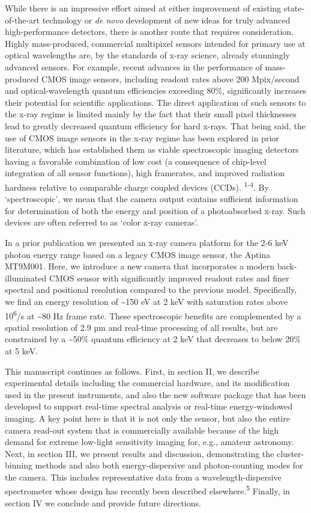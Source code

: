 While there is an impressive effort aimed at either improvement of
existing state-of-the-art technology or \emph{de novo} development of
new ideas for truly advanced high-performance detectors, there is
another route that requires consideration. Highly mass-produced,
commercial multipixel sensors intended for primary use at optical
wavelengths are, by the standards of x-ray science, already stunningly
advanced sensors. For example, recent advances in the performance of
mass-produced CMOS image sensors, including readout rates above 200
Mpix/second and optical-wavelength quantum efficiencies exceeding 80\%,
significantly increases their potential for scientific applications. The
direct application of such sensors to the x-ray regime is limited mainly
by the fact that their small pixel thicknesses lead to greatly decreased
quantum efficiency for hard x-rays. That being said, the use of CMOS
image sensors in the x-ray regime has been explored in prior literature,
which has established them as viable spectroscopic imaging detectors
having a favorable combination of low cost (a consequence of chip-level
integration of all sensor functions), high framerates, and improved
radiation hardness relative to comparable charge coupled devices (CCDs).
\textsuperscript{1-4}. By `spectroscopic', we mean that the camera
output contains sufficient information for determination of both the
energy and position of a photoabsorbed x-ray. Such devices are often
referred to as `color x-ray cameras'.

In a prior publication we presented an x-ray camera platform for the 2-6
keV photon energy range based on a legacy CMOS image sensor, the Aptina
MT9M001. Here, we introduce a new camera that incorporates a modern
back-illuminated CMOS sensor with significantly improved readout rates
and finer spectral and positional resolution compared to the previous
model. Specifically, we find an energy resolution of
\textasciitilde{}150 eV at 2 keV with saturation rates above
10\textsuperscript{6}/s at \textasciitilde{}80 Hz frame rate. These
spectroscopic benefits are complemented by a spatial resolution of 2.9
µm and real-time processing of all results, but are constrained by a
\textasciitilde{}50\% quantum efficiency at 2 keV that decreases to
below 20\% at 5 keV.

This manuscript continues as follows. First, in section II, we describe
experimental details including the commercial hardware, and its
modification used in the present instruments, and also the new software
package that has been developed to support real-time spectral analysis
or real-time energy-windowed imaging. A key point here is that it is not
only the sensor, but also the entire camera read-out system that is
commercially available because of the high demand for extreme low-light
sensitivity imaging for, e.g., amateur astronomy. Next, in section III,
we present results and discussion, demonstrating the cluster-binning
methods and also both energy-dispersive and photon-counting modes for
the camera. This includes representative data from a
wavelength-dispersive spectrometer whose design has recently been
described elsewhere.\textsuperscript{5} Finally, in section IV we
conclude and provide future directions.

